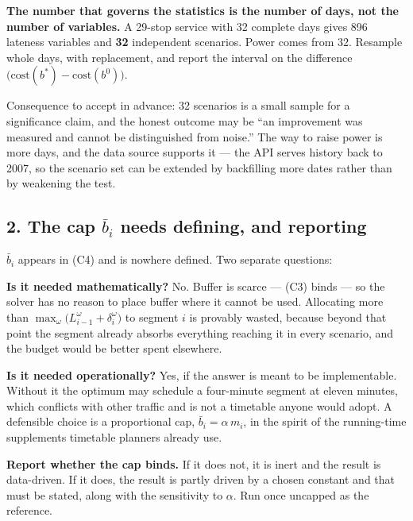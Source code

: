 \documentclass[11pt,a4paper]{article}
\begin{document}
\begin{keybox}
\textbf{The number that governs the statistics is the number of days, not the number of
variables.} A 29-stop service with 32 complete days gives 896 lateness variables and
\textbf{32} independent scenarios. Power comes from 32. Resample whole days, with
replacement, and report the interval on the difference $\big(\text{cost}(b^\ast) -
\text{cost}(b^0)\big)$.
\end{keybox}

\noindent Consequence to accept in advance: 32 scenarios is a small sample for a
significance claim, and the honest outcome may be ``an improvement was measured and cannot
be distinguished from noise.'' The way to raise power is more days, and the data source
supports it --- the API serves history back to 2007, so the scenario set can be extended by
backfilling more dates rather than by weakening the test.

\subsection*{2. The cap $\bar b_i$ needs defining, and reporting}

$\bar b_i$ appears in (C4) and is nowhere defined. Two separate questions:

\textbf{Is it needed mathematically?} No. Buffer is scarce --- (C3) binds --- so the solver
has no reason to place buffer where it cannot be used. Allocating more than
$\max_\omega\bigl(L_{i-1}^\omega + \delta_i^\omega\bigr)$ to segment $i$ is provably wasted,
because beyond that point the segment already absorbs everything reaching it in every
scenario, and the budget would be better spent elsewhere.

\textbf{Is it needed operationally?} Yes, if the answer is meant to be implementable.
Without it the optimum may schedule a four-minute segment at eleven minutes, which conflicts
with other traffic and is not a timetable anyone would adopt. A defensible choice is a
proportional cap, $\bar b_i = \alpha \, m_i$, in the spirit of the running-time supplements
timetable planners already use.

\begin{keybox}
\textbf{Report whether the cap binds.} If it does not, it is inert and the result is
data-driven. If it does, the result is partly driven by a chosen constant and that must be
stated, along with the sensitivity to $\alpha$. Run once uncapped as the reference.
\end{keybox}
\end{document}
